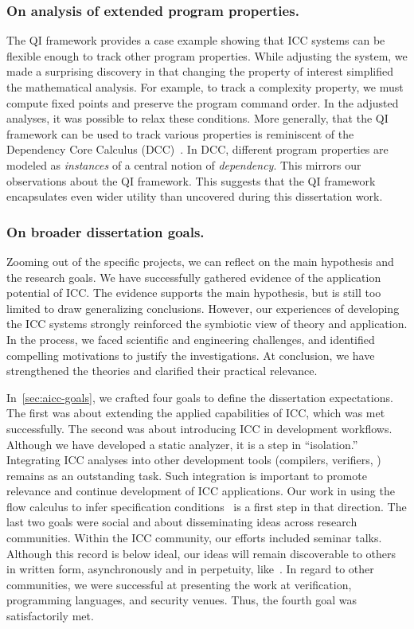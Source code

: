 \subsubsection*{On analysis of extended program properties.}
The QI framework provides a case example showing that ICC systems can be flexible enough to track other program properties.
While adjusting the system, we made a surprising discovery in that changing the property of interest simplified the mathematical analysis.
For example, to track a complexity property, we must compute fixed points and preserve the program command order.
In the adjusted analyses, it was possible to relax these conditions.
More generally, that the QI framework can be used to track various properties is reminiscent of the Dependency Core Calculus (DCC)~\cite{abadi1999b}.
In DCC, different program properties are modeled as \emph{instances} of a central notion of \emph{dependency}.
This mirrors our observations about the QI framework.
This suggests that the QI framework encapsulates even wider utility than uncovered during this dissertation work.

\subsubsection*{On broader dissertation goals.}
Zooming out of the specific projects, we can reflect on the main hypothesis and the research goals.
We have successfully gathered evidence of the application potential of ICC.
The evidence supports the main hypothesis, but is still too limited to draw generalizing conclusions.
However, our experiences of developing the ICC systems strongly reinforced the symbiotic view of theory and application.
In the process, we faced scientific and engineering challenges, and identified compelling motivations to justify the investigations.
At conclusion, we have strengthened the theories and clarified their practical relevance.

In~\autoref{sec:aicc-goals}, we crafted four goals to define the dissertation expectations.
The first was about extending the applied capabilities of ICC, which was met successfully.
The second was about introducing ICC in development workflows.
Although we have developed a static analyzer, it is a step in \enquote{isolation.}
Integrating ICC analyses into other development tools (compilers, verifiers, \etc) remains as an outstanding task.
Such integration is important to promote relevance and continue development of ICC {applications}.
Our work in using the flow calculus to infer specification conditions~\cite{rusch2025} is a first step in that direction.
The last two goals were social and about disseminating ideas across research communities.
Within the ICC community, our efforts included seminar talks.
Although this record is below ideal, our ideas will remain discoverable to others in written form, asynchronously and in perpetuity, like~\cite{moyen2017}.
In regard to other communities, we were successful at presenting the work at verification, programming languages, and security venues.
Thus, the fourth goal was satisfactorily met.

